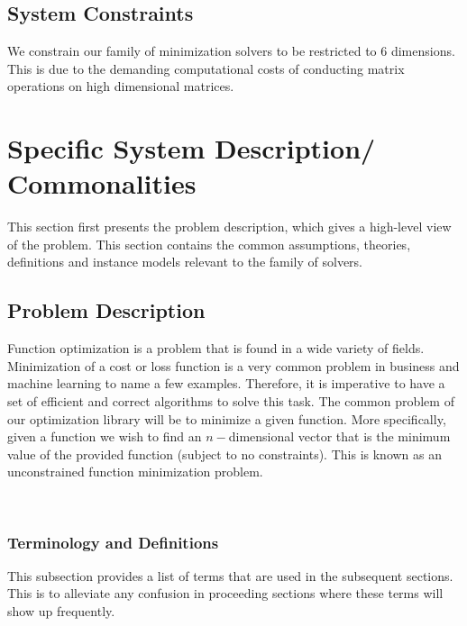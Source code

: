 \documentclass[12pt]{article}
\begin{document}
\subsection{System Constraints}
We constrain our family of minimization solvers to be restricted to 6 dimensions. This is due to the demanding computational costs of conducting matrix operations on high dimensional matrices.


\section{Specific System Description/ Commonalities}


This section first presents the problem description, which gives a high-level
view of the problem. This section contains the common assumptions, theories, definitions and instance models relevant to the family of solvers.



\subsection{Problem Description} \label{Sec_pd}
Function optimization is a problem that is found in a wide variety of fields. Minimization of a cost or loss function is a very common problem in business and machine learning to name a few examples. Therefore, it is imperative to have a set of efficient and correct algorithms to solve this task. 
 The common problem of our optimization library will be to minimize a given function. More specifically, given a function we wish to find an $n-$dimensional vector that is the minimum value of the provided function (subject to no constraints). This is known as an unconstrained function minimization problem.
 
\\




\subsubsection{Terminology and  Definitions}

This subsection provides a list of terms that are used in the subsequent
sections. This is to alleviate any confusion in proceeding sections where these terms will show up frequently.
\end{document}
